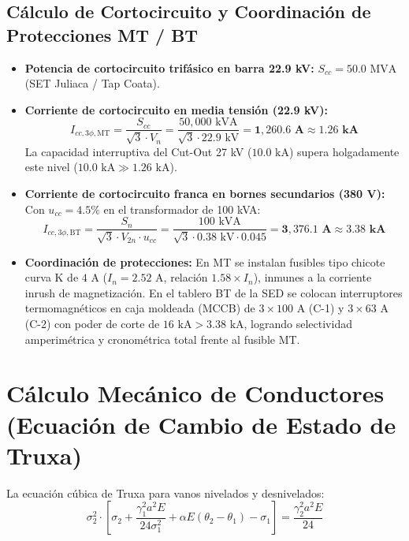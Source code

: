 \documentclass[12pt,a4paper]{report}
\begin{document}
\subsection{Cálculo de Cortocircuito y Coordinación de Protecciones MT / BT}
\begin{itemize}
    \item \textbf{Potencia de cortocircuito trifásico en barra 22.9 kV:} $S_{cc} = 50.0\text{ MVA}$ (SET Juliaca / Tap Coata).
    \item \textbf{Corriente de cortocircuito en media tensión (22.9 kV):}
    \begin{equation}
        I_{cc,3\phi,\text{MT}} = \frac{S_{cc}}{\sqrt{3} \cdot V_n} = \frac{50,000\text{ kVA}}{\sqrt{3} \cdot 22.9\text{ kV}} = \mathbf{1,260.6\text{ A}} \approx \mathbf{1.26\text{ kA}}
    \end{equation}
    La capacidad interruptiva del Cut-Out 27 kV ($10.0\text{ kA}$) supera holgadamente este nivel ($10.0\text{ kA} \gg 1.26\text{ kA}$).
    \item \textbf{Corriente de cortocircuito franca en bornes secundarios (380 V):} Con $u_{cc} = 4.5\%$ en el transformador de 100 kVA:
    \begin{equation}
        I_{cc,3\phi,\text{BT}} = \frac{S_n}{\sqrt{3} \cdot V_{2n} \cdot u_{cc}} = \frac{100\text{ kVA}}{\sqrt{3} \cdot 0.38\text{ kV} \cdot 0.045} = \mathbf{3,376.1\text{ A}} \approx \mathbf{3.38\text{ kA}}
    \end{equation}
    \item \textbf{Coordinación de protecciones:} En MT se instalan fusibles tipo chicote curva K de $4\text{ A}$ ($I_n = 2.52\text{ A}$, relación $1.58 \times I_n$), inmunes a la corriente inrush de magnetización. En el tablero BT de la SED se colocan interruptores termomagnéticos en caja moldeada (MCCB) de $3 \times 100\text{ A}$ (C-1) y $3 \times 63\text{ A}$ (C-2) con poder de corte de $16\text{ kA} > 3.38\text{ kA}$, logrando selectividad amperimétrica y cronométrica total frente al fusible MT.
\end{itemize}

\section{Cálculo Mecánico de Conductores (Ecuación de Cambio de Estado de Truxa)}
La ecuación cúbica de Truxa para vanos nivelados y desnivelados:
\begin{equation}
    \sigma_2^2 \cdot \left[ \sigma_2 + \frac{\gamma_1^2 a^2 E}{24 \sigma_1^2} + \alpha E (\theta_2 - \theta_1) - \sigma_1 \right] = \frac{\gamma_2^2 a^2 E}{24}
\end{equation}
\end{document}
